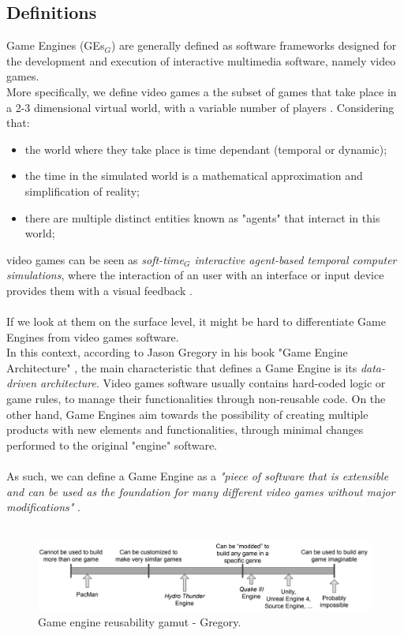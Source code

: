 \subsection{Definitions}
Game Engines (GEs$_G$) are generally defined as software frameworks designed for the development and execution of interactive multimedia software, namely video games. \\
More specifically, we define video games a the subset of games that take place in a 2-3 dimensional virtual world, with a variable number of players \cite{womak:distributed-cloud-gaming-pipeline}. Considering that:
\begin{itemize}
	\item the world where they take place is time dependant (temporal or dynamic);
	\item the time in the simulated world is a mathematical approximation and simplification of reality;
	\item there are multiple distinct entities known as "agents" that interact in this world;
\end{itemize}
video games can be seen as \textit{soft-time$_G$ interactive agent-based temporal computer simulations}, where the interaction of an user with an interface or input device provides them with a visual feedback \cite{site:game-engine-wiki, womak:gregory-game-engine}. \\ \\
If we look at them on the surface level, it might be hard to differentiate Game Engines from video games software. \\
In this context, according to Jason Gregory in his book "Game Engine Architecture" \cite{womak:gregory-game-engine}, the main characteristic that defines a Game Engine is its \textit{data-driven architecture}.
Video games software usually contains hard-coded logic or game rules, to manage their functionalities through non-reusable code. On the other hand, Game Engines aim towards the possibility of creating multiple products with new elements and functionalities, through minimal changes performed to the original "engine" software. \\ \\
As such, we can define a Game Engine as a \textit{"piece of software that is extensible and can be used as the foundation for many different video games without major modifications"} \cite{womak:gregory-game-engine}. \\ \\
\begin{figure}
	\centering
	\includegraphics[width=1\linewidth]{"immagini/State-of-the-art/Reusability gamut"}
	\caption[Game engine reusability gamut - Gregory]{Game engine reusability gamut - Gregory.}
	\label{fig:reusability-gamut}
\end{figure}

